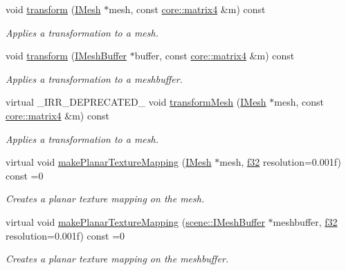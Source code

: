 \begin{DoxyCompactItemize}
void \hyperlink{classirr_1_1scene_1_1IMeshManipulator_a9f9962d31cbd4ebeb1be0812765884cf}{transform} (\hyperlink{classirr_1_1scene_1_1IMesh}{I\+Mesh} $\ast$mesh, const \hyperlink{namespaceirr_1_1core_a4c9d4e29899535971052810954a14431}{core\+::matrix4} \&m) const
\begin{DoxyCompactList}\small\item\em Applies a transformation to a mesh. \end{DoxyCompactList}\item 
void \hyperlink{classirr_1_1scene_1_1IMeshManipulator_a14dc2101f7facaddec49f59ed363bbc1}{transform} (\hyperlink{classirr_1_1scene_1_1IMeshBuffer}{I\+Mesh\+Buffer} $\ast$buffer, const \hyperlink{namespaceirr_1_1core_a4c9d4e29899535971052810954a14431}{core\+::matrix4} \&m) const
\begin{DoxyCompactList}\small\item\em Applies a transformation to a meshbuffer. \end{DoxyCompactList}\item 
virtual \+\_\+\+I\+R\+R\+\_\+\+D\+E\+P\+R\+E\+C\+A\+T\+E\+D\+\_\+ void \hyperlink{classirr_1_1scene_1_1IMeshManipulator_a10e09e28622a5d1f5fd0f3a65fd2cb5b}{transform\+Mesh} (\hyperlink{classirr_1_1scene_1_1IMesh}{I\+Mesh} $\ast$mesh, const \hyperlink{namespaceirr_1_1core_a4c9d4e29899535971052810954a14431}{core\+::matrix4} \&m) const
\begin{DoxyCompactList}\small\item\em Applies a transformation to a mesh. \end{DoxyCompactList}\item 
virtual void \hyperlink{classirr_1_1scene_1_1IMeshManipulator_a82a3092d53e84e751bb13dac8dfa2ab4}{make\+Planar\+Texture\+Mapping} (\hyperlink{classirr_1_1scene_1_1IMesh}{I\+Mesh} $\ast$mesh, \hyperlink{namespaceirr_a0277be98d67dc26ff93b1a6a1d086b07}{f32} resolution=0.\+001f) const =0
\begin{DoxyCompactList}\small\item\em Creates a planar texture mapping on the mesh. \end{DoxyCompactList}\item 
virtual void \hyperlink{classirr_1_1scene_1_1IMeshManipulator_a757511833420a24ed8cbf4dfd6607143}{make\+Planar\+Texture\+Mapping} (\hyperlink{classirr_1_1scene_1_1IMeshBuffer}{scene\+::\+I\+Mesh\+Buffer} $\ast$meshbuffer, \hyperlink{namespaceirr_a0277be98d67dc26ff93b1a6a1d086b07}{f32} resolution=0.\+001f) const =0
\begin{DoxyCompactList}\small\item\em Creates a planar texture mapping on the meshbuffer. \end{DoxyCompactList}\item 

\end{DoxyCompactItemize}
